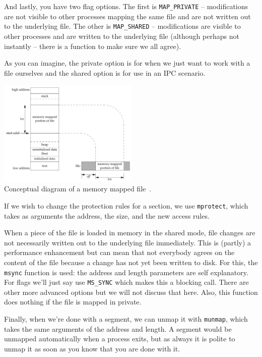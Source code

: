 And lastly, you have two flag options. The first is \texttt{MAP\_PRIVATE} -- modifications are not visible to other processes mapping the same file and are not written out to the underlying file. The other is \texttt{MAP\_SHARED} -- modifications are visible to other processes and are written to the underlying file (although perhaps not instantly -- there is a function to make sure we all agree).

As you can imagine, the private option is for when we just want to work with a file ourselves and the shared option is for use in an IPC scenario.

\begin{center}
	\includegraphics[width=0.5\textwidth]{images/memory-mapped-file.png}\\
	Conceptual diagram of a memory mapped file~\cite{apunix}.
\end{center}

If we wish to change the protection rules for a section, we use \texttt{mprotect}, which takes as arguments the address, the size, and the new access rules.

When a piece of the file is loaded in memory in the shared mode, file changes are not necessarily written out to the underlying file immediately. This is (partly) a performance enhancement but can mean that not everybody agrees on the content of the file because a change has not yet been written to disk. For this, the \texttt{msync} function is used: the address and length parameters are self explanatory. For flags we'll just say use \texttt{MS\_SYNC} which makes this a blocking call. There are other more advanced options but we will not discuss that here. Also, this function does nothing if the file is mapped in private.

Finally, when we're done with a segment, we can unmap it with \texttt{munmap}, which takes the same arguments of the address and length. A segment would be unmapped automatically when a process exits, but as always it is polite to unmap it as soon as you know that you are done with it.

